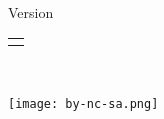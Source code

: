 
\thispagestyle{empty}
	
	\begin{center}
		\makeatletter
		{\bf {\Huge \@title}}
		\\[2cm]
		{\bf {\LARGE \subtitlename}}\\[4cm]
		\@date\\[2cm]
		{\footnotesize Version \revname}
		\\[7cm]
		\begin{tabular}[t]{c} \@author \end{tabular}\\[3cm]
		\makeatother
		
		\begin{center}
			\texttt{[image: by-nc-sa.png]}
		\end{center}
	\end{center}

\cleardoublepage


